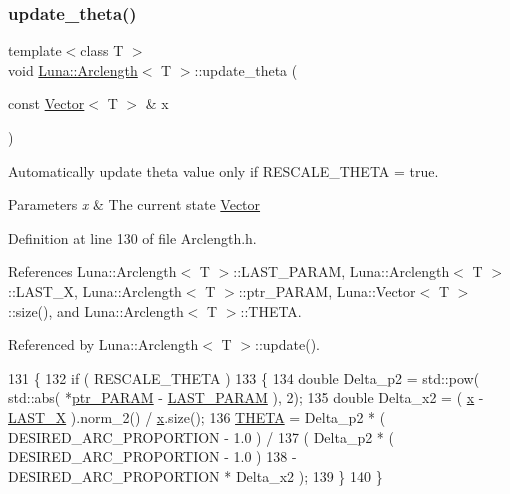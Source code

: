 \subsubsection{\texorpdfstring{update\+\_\+theta()}{update\_theta()}}
{\footnotesize\ttfamily template$<$class T $>$ \\
void \hyperlink{classLuna_1_1Arclength}{Luna\+::\+Arclength}$<$ T $>$\+::update\+\_\+theta (\begin{DoxyParamCaption}\item[{const \hyperlink{classLuna_1_1Vector}{Vector}$<$ T $>$ \&}]{x }\end{DoxyParamCaption})\hspace{0.3cm}{\ttfamily [protected]}}



Automatically update theta value only if R\+E\+S\+C\+A\+L\+E\+\_\+\+T\+H\+E\+TA = true. 


\begin{DoxyParams}{Parameters}
{\em x} & The current state \hyperlink{classLuna_1_1Vector}{Vector} \\
\hline
\end{DoxyParams}


Definition at line 130 of file Arclength.\+h.



References Luna\+::\+Arclength$<$ T $>$\+::\+L\+A\+S\+T\+\_\+\+P\+A\+R\+AM, Luna\+::\+Arclength$<$ T $>$\+::\+L\+A\+S\+T\+\_\+X, Luna\+::\+Arclength$<$ T $>$\+::ptr\+\_\+\+P\+A\+R\+AM, Luna\+::\+Vector$<$ T $>$\+::size(), and Luna\+::\+Arclength$<$ T $>$\+::\+T\+H\+E\+TA.



Referenced by Luna\+::\+Arclength$<$ T $>$\+::update().


\begin{DoxyCode}
131   \{
132     \textcolor{keywordflow}{if} ( RESCALE\_THETA )
133     \{
134       \textcolor{keywordtype}{double} Delta\_p2 = std::pow( std::abs( *\hyperlink{classLuna_1_1Arclength_a984cead721a38abf1ab2a489052461e0}{ptr\_PARAM} - \hyperlink{classLuna_1_1Arclength_a98e8241f24a16ea9f12e514d8d8f841b}{LAST\_PARAM} ), 2);
135       \textcolor{keywordtype}{double} Delta\_x2 = ( \hyperlink{namespaceHeat__plot_aa88370c16b85b784ccbde3ed88bc1991}{x} - \hyperlink{classLuna_1_1Arclength_a6d6ba83245b4dd616d265609a93035a2}{LAST\_X} ).norm\_2() / \hyperlink{namespaceHeat__plot_aa88370c16b85b784ccbde3ed88bc1991}{x}.size();
136       \hyperlink{classLuna_1_1Arclength_aa17766cf4bcbe5b063dc2a95f89baf42}{THETA} = Delta\_p2 * ( DESIRED\_ARC\_PROPORTION - 1.0 ) /
137              ( Delta\_p2 * ( DESIRED\_ARC\_PROPORTION - 1.0 )
138               - DESIRED\_ARC\_PROPORTION * Delta\_x2 );
139     \}
140   \}
\end{DoxyCode}


